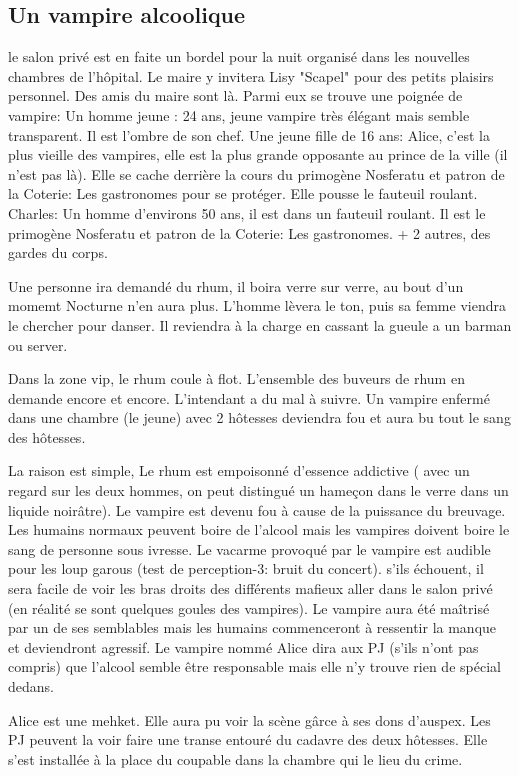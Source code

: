 \documentclass[oneside,12pt]{book}
\begin{document}
\begin{flushleft}
\section{Un vampire alcoolique}
le salon privé est en faite un bordel pour la nuit organisé dans les nouvelles chambres de l'hôpital.
Le maire y invitera Lisy "Scapel" pour des petits plaisirs personnel. Des amis du maire sont là. Parmi eux se trouve une poignée de vampire:
Un homme jeune : 24 ans, jeune vampire très élégant mais semble transparent. Il est l'ombre de son chef.
Une jeune fille de 16 ans: Alice, c'est la plus vieille des vampires, elle est la plus grande opposante au prince de la ville (il n'est pas là). 
Elle se cache derrière la cours du primogène Nosferatu et patron de la Coterie: Les gastronomes pour se protéger.
Elle pousse le fauteuil roulant.
Charles: Un homme d'environs 50 ans, il est dans un fauteuil roulant. Il est le primogène Nosferatu et patron de la Coterie: Les gastronomes.
+ 2 autres, des gardes du corps. 

Une personne ira demandé du rhum, il boira verre sur verre, au bout d'un momemt Nocturne n'en aura plus.
L'homme lèvera le ton, puis sa femme viendra le chercher pour danser. Il reviendra à la charge en cassant la gueule a un barman ou server. 

Dans la zone vip, le rhum coule à flot.
L'ensemble des buveurs de rhum en demande encore et encore. L'intendant a du mal à suivre.
Un vampire enfermé dans une chambre (le jeune) avec 2 hôtesses deviendra fou et aura bu tout le sang des hôtesses.

La raison est simple, Le rhum est empoisonné d'essence addictive ( avec un regard sur les deux hommes, on peut distingué un hameçon dans le verre dans un liquide noirâtre).
Le vampire est devenu fou à cause de la puissance du breuvage. Les humains normaux peuvent boire de l'alcool mais les vampires doivent boire le sang de personne sous ivresse. 
Le vacarme provoqué par le vampire est audible pour les loup garous (test de perception-3: bruit du concert).
s'ils échouent, il sera facile de voir les bras droits des différents mafieux aller dans le salon privé (en réalité se sont quelques goules des vampires). Le vampire aura été maîtrisé par un de ses semblables mais les humains commenceront à ressentir la manque et deviendront agressif.
Le vampire nommé Alice dira aux PJ  (s'ils n'ont pas compris) que l'alcool semble être responsable mais elle n'y trouve rien de spécial dedans. 

Alice est une mehket. Elle aura pu voir la scène gârce à ses dons d'auspex. Les PJ peuvent la voir faire une transe entouré du cadavre des deux hôtesses.
Elle s'est installée à la place du coupable dans la chambre qui le lieu du crime. 



\end{flushleft}
\end{document}
